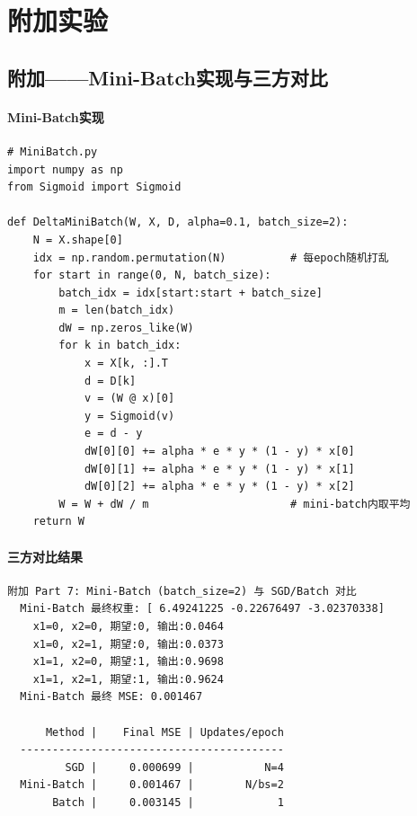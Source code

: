 \documentclass[10.5pt]{config}
\begin{document}
\clearpage
\section{附加实验}

\subsection{附加——Mini-Batch实现与三方对比}

\paragraph{Mini-Batch实现}

\begin{listing}[H]
\begin{verbatim}
# MiniBatch.py
import numpy as np
from Sigmoid import Sigmoid

def DeltaMiniBatch(W, X, D, alpha=0.1, batch_size=2):
    N = X.shape[0]
    idx = np.random.permutation(N)          # 每epoch随机打乱
    for start in range(0, N, batch_size):
        batch_idx = idx[start:start + batch_size]
        m = len(batch_idx)
        dW = np.zeros_like(W)
        for k in batch_idx:
            x = X[k, :].T
            d = D[k]
            v = (W @ x)[0]
            y = Sigmoid(v)
            e = d - y
            dW[0][0] += alpha * e * y * (1 - y) * x[0]
            dW[0][1] += alpha * e * y * (1 - y) * x[1]
            dW[0][2] += alpha * e * y * (1 - y) * x[2]
        W = W + dW / m                      # mini-batch内取平均
    return W
\end{verbatim}
\caption{Mini-Batch训练函数（每个mini-batch内取平均后更新，每epoch共 $N/\text{bs}$ 次更新）}
\end{listing}

\paragraph{三方对比结果}

\begin{lstlisting}[language={}, numbers=none, frame=single, backgroundcolor=\color{codebg}, basicstyle=\ttfamily\footnotesize, breaklines=true]
附加 Part 7: Mini-Batch (batch_size=2) 与 SGD/Batch 对比
  Mini-Batch 最终权重: [ 6.49241225 -0.22676497 -3.02370338]
    x1=0, x2=0, 期望:0, 输出:0.0464
    x1=0, x2=1, 期望:0, 输出:0.0373
    x1=1, x2=0, 期望:1, 输出:0.9698
    x1=1, x2=1, 期望:1, 输出:0.9624
  Mini-Batch 最终 MSE: 0.001467

      Method |    Final MSE | Updates/epoch
  -----------------------------------------
         SGD |     0.000699 |           N=4
  Mini-Batch |     0.001467 |        N/bs=2
       Batch |     0.003145 |             1
\end{lstlisting}
\end{document}
